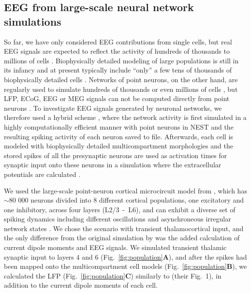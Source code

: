 \documentclass[preprint,10pt,authoryear]{elsarticle}
\begin{document}
\subsection{EEG from large-scale neural network simulations}
\label{subsec:populations}
So far, we have only considered EEG contributions from single cells, but real EEG signals are expected to reflect the activity of hundreds of thousands to millions of cells \citep{NUNEZ2006, COHEN2017}. 
Biophysically detailed modeling of large populations is still in its infancy \citep{EINEVOLL2019} and at present typically include ``only'' a few tens of thousands of biophysically detailed cells \citep{MARKRAM2015, BILLEH2019}. Networks of point neurons, on the other hand, are regularly used to simulate hundreds of thousands \citep{BILLEH2019} or even millions of cells \citep{SENK2018, SCHMIDT2018}, but LFP, ECoG, EEG or MEG signals can not be computed directly from point neurons \citep{EINEVOLL2013REVIEW, Ness2020}.  
To investigate EEG signals generated by neuronal networks, we therefore used a hybrid scheme \citep{HAGEN2016, SENK2018, Skaar2020}, where the network activity is first simulated in a highly computationally efficient manner with point neurons in NEST \citep{NEST} and the resulting spiking activity of each neuron saved to file. Afterwards, each cell is modeled with biophysically detailed multicompartment morphologies and the stored spikes of all the presynaptic neurons are used as activation times for synaptic input onto these neurons in a simulation where the extracellular potentials are calculated \citep{HAGEN2016, SENK2018}.

We used the large-scale point-neuron cortical microcircuit model from \cite{POTJANS2014, HAGEN2016}, which has $\sim$80 000 neurons divided into 8 different cortical populations, one excitatory and one inhibitory, across four layers (L2/3~-~L6), and can exhibit a diverse set of spiking dynamics including different oscillations and asynchroneous irregular network states \citep{HAGEN2016, BRUNEL2000}. 
We chose the scenario with transient thalamocortical input, and the only difference from the original simulation by \cite{HAGEN2016} was the added calculation of current dipole moments and EEG signals.
We simulated transient thalamic synaptic input to layers 4 and 6 (Fig.~\ref{fig:population}\textbf{A}), and after the spikes had been mapped onto the multicompartment cell models (Fig.~\ref{fig:population}\textbf{B}), we calculated the LFP (Fig.~\ref{fig:population}\textbf{C}) similarly to \cite{HAGEN2016} (their Fig.~1), in addition to the current dipole moments of each cell.
\end{document}
